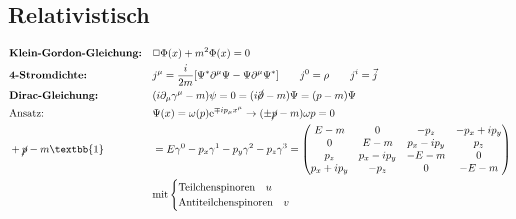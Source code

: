 \documentclass[10pt,a4paper,notitlepage]{scrartcl}
\begin{document}
\subsection*{Relativistisch}
\begin{align*}
    &\textbf{Klein-Gordon-Gleichung:} && \Box\Phi(x) + m^2\Phi(x) = 0 \\
    &\textbf{4-Stromdichte:}&& j^\mu = \frac{i}{2m}[\Psi^\ast\partial^\mu\Psi - \Psi\partial^\mu\Psi^\ast]
    \qquad j^0 = \rho  \qquad j^i = \vec{j}\\
    &\textbf{Dirac-Gleichung:} && (i\partial_\mu\gamma^\mu-m)\psi = 0 = (i\cancel{\partial}-m)\Psi = (p - m) \Psi\\
    &\text{Ansatz:} && \Psi(x) = \omega(p) \text{e}^{\mp i p_\mu x^\mu} \to (\pm \cancel{p}-m)\omega{p}=0\\
    &+\cancel{p} - m\textbb{1} && = E\gamma^0-p_x\gamma^1 -p_y\gamma^2-p_z\gamma^3 = 
    \begin{pmatrix}
        E-m           &     0         &       -p_z        & -p_x + i p_y \\
        0             &     E-m       &   p_x - i p_y     & p_z \\
        p_z           & p_x - i p_y   &      -E-m         & 0 \\
        p_x + i p_y   &     -p_z      &     0             & -E-m \\
    \end{pmatrix}\\
    &&&\text{mit} \begin{cases}
                                 \text{Teilchenspinoren}\quad u \\
                                 \text{Antiteilchenspinoren}\quad v \\
    \end{cases} \\
\end{align*}
\end{document}
